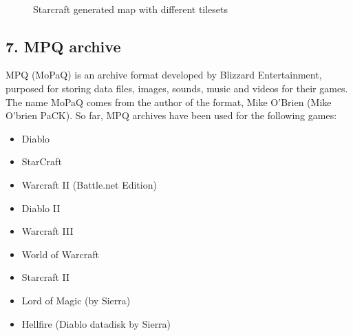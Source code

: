 \documentclass[letterpaper]{article}
\begin{document}
\begin{figure}[ht]
  \centering
  ~ %
  ~ %
  \caption{Starcraft generated map with different tilesets}
  \label{fig:final-maps}
\end{figure}

\subsection{7. MPQ archive}
MPQ (MoPaQ) is an archive format developed by Blizzard Entertainment, purposed for storing data files, images, sounds, music and videos for their games. The name MoPaQ comes from the author of the format, Mike O'Brien (Mike O'brien PaCK). So far, MPQ archives have been used for the following games:
\begin{itemize}
	\item Diablo
	\item StarCraft
	\item Warcraft II (Battle.net Edition)
	\item Diablo II
	\item Warcraft III
	\item World of Warcraft
	\item Starcraft II
	\item Lord of Magic (by Sierra)
	\item Hellfire (Diablo datadisk by Sierra)
\end{itemize}
\end{document}
